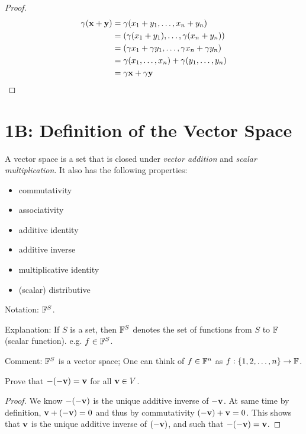 \documentclass{extarticle}
\begin{document}
\begin{proof}
\begin{align*}
    \gamma(\mathbf{x} + \mathbf{y})
    &= \gamma (x_1 + y_1, \ldots, x_n + y_n) \\ 
    &= (\gamma(x_1 + y_1), \ldots, \gamma(x_n + y_n)) \\ 
    &= (\gamma x_1 + \gamma y_1, \ldots, \gamma x_n + \gamma y_n) \\ 
    &= \gamma (x_1, \ldots, x_n) + \gamma(y_1, \ldots, y_n) \\ 
    &= \gamma \mathbf{x} + \gamma \mathbf{y} 
\end{align*}
\end{proof}


\newpage 

\section*{1B: Definition of the Vector Space}


\begin{thm}
    A vector space is a set that is closed under \emph{vector addition} and \emph{scalar multiplication}. 
    It also has the following properties:
    \begin{itemize}
        \item commutativity 
        \item associativity 
        \item additive identity 
        \item additive inverse 
        \item multiplicative identity
        \item (scalar) distributive 
    \end{itemize}
\end{thm}

Notation: \(\mathbb{F}^S\). 

Explanation: If \(S\) is a set, then \(\mathbb{F}^S\) denotes the set of functions from \(S\) to \(\mathbb{F}\) (scalar
function). e.g. \(f \in \mathbb{F}^S\). 

Comment: \(\mathbb{F}^S\) is a vector space; One can think of \(f \in \mathbb{F}^n\) as \(f:
\{1, 2,\ldots, n\} \to \mathbb{F}\). 


\begin{problem}{1}
    Prove that \(-(-\mathbf{v}) = \mathbf{v}\) for all \(\mathbf{v} \in V\). 
\end{problem}

\begin{proof}
We know \(- (-\mathbf{v})\) is the unique additive inverse of \(-\mathbf{v}\). At same time by definition,
\(\mathbf{v} + (-\mathbf{v}) = 0\) and thus by commutativity \((-\mathbf{v}) + \mathbf{v} = 0\). This shows that \(\mathbf{v}\)
is the unique additive inverse of \((-\mathbf{v})\), and such that \(-(-\mathbf{v}) = \mathbf{v}\). 
\end{proof}
\end{document}
